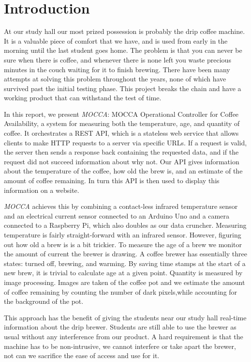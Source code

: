 \documentclass[12pt,a4paper,oneside,article]{memoir}
\numberwithin{equation}{chapter}
\begin{document}
\section{Introduction}\label{sec:introduction}
At our study hall our most prized possession is probably the drip coffee
machine. It is a valuable piece of comfort that we have, and is used from early
in the morning until the last student goes home. The problem is that you can
never be sure when there is coffee, and whenever there is none left you waste
precious minutes in the couch waiting for it to finish brewing. There have been
many attempts at solving this problem throughout the years, none of which have
survived past the initial testing phase. This project breaks the chain and have
a working product that can withstand the test of time.

In this report, we present \textit{MOCCA}: MOCCA Operational Controller for
Coffee Availability, a system for measuring both the temperature, age, and
quantity of coffee. It orchestrates a REST API, which is a stateless web service
that allows clients to make HTTP requests to a server via specific URLs. If a
request is valid, the server then sends a response back containing the requested
data, and if the request did not succeed information about why not. Our API
gives information about the temperature of the coffee, how old the brew is, and
an estimate of the amount of coffee remaining. In turn this API is then used to
display this information on a website.

\textit{MOCCA} achieves this by combining a contact-less infrared temperature
sensor and an electrical current sensor connected to an Arduino Uno and a camera
connected to a Raspberry Pi, which also doubles as our data cruncher. Measuring
temperature is fairly straight-forward with an infrared sensor. However,
figuring out how old a brew is is a bit trickier. To measure the age of a brew
we monitor the amount of current the brewer is drawing. A coffee brewer has
essentially three states: turned off, brewing, and warming. By saving time
stamps at the start of a new brew, it is trivial to calculate age at a given
point. Quantity is measured by image processing. Images are taken of the coffee
pot and we estimate the amount of coffee remaining by counting the number of
dark pixels,while accounting for the background of the pot.

This approach has the benefit of giving the students near our study hall 
real-time information about the drip brewer. Students are still able to use the 
brewer as usual without any interference from our product. A hard requirement
is that the machine has to be non-intrusive, we cannot interfere or take apart
the brewer, not can we sacrifice the ease of access and use for it.
\end{document}

